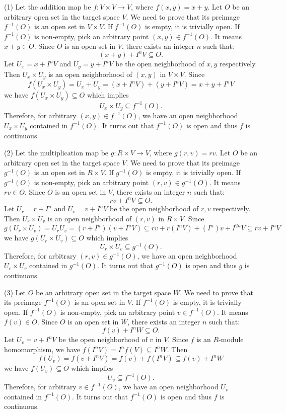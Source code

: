 \begin{solution}
    (1) Let the addition map be $f: V \times V \to V$, where $f(x, y) = x + y$.
    Let $O$ be an arbitrary open set in the target space $V$.
    We need to prove that its preimage $f^{-1}(O)$ is an open set in $V \times V$.
    If $f^{-1}(O)$ is empty, it is trivially open.
    If $f^{-1}(O)$ is non-empty, pick an arbitrary point $(x, y) \in f^{-1}(O)$.
    It means $x + y \in O$.
    Since $O$ is an open set in $V$, there exists an integer $n$ such that:$$(x + y) + I^n V \subseteq O.$$
    Let $U_x = x + I^n V$ and $U_y = y + I^n V$ be the open neighborhood of $x,y$ respectively. Then $U_x \times U_y$ is an open neighborhood of $(x, y)$ in $V \times V$.
    Since $$f(U_x \times U_y) = U_x + U_y = (x + I^n V) + (y + I^n V) = x + y + I^n V$$
    we have $f(U_x \times U_y) \subseteq O$ which implies $$U_x \times U_y \subseteq f^{-1}(O).$$
    Therefore, for arbitrary $(x,y)\in f^{-1}(O)$, we have an open neighborhood $U_x\times U_y$ contained in $f^{-1}(O)$. It turns out that $f^{-1}(O)$ is open and thus $f$ is continuous. 

    (2) Let the multiplication map be $g : R \times V \to V$, where $g(r,v) = rv$. Let $O$ be an arbitrary open set in the target space $V$. We need to prove that its preimage $g^{-1}(O)$ is an open set in $R \times V$. If $g^{-1}(O)$ is empty, it is trivially open. If $g^{-1}(O)$ is non-empty, pick an arbitrary point $(r,v) \in g^{-1}(O)$. It means $rv \in O$. Since $O$ is an open set in $V$, there exists an integer $n$ such that:$$rv + I^n V \subseteq O.$$Let $U_r = r + I^n$ and $U_v = v + I^n V$ be the open neighborhood of $r, v$ respectively. Then $U_r \times U_v$ is an open neighborhood of $(r,v)$ in $R \times V$. Since$$g(U_r \times U_v) = U_r U_v = (r + I^n)(v + I^n V) \subseteq rv + r(I^n V) + (I^n)v + I^{2n}V \subseteq rv + I^n V$$we have $g(U_r \times U_v) \subseteq O$ which implies$$U_r \times U_v \subseteq g^{-1}(O).$$Therefore, for arbitrary $(r,v) \in g^{-1}(O)$, we have an open neighborhood $U_r \times U_v$ contained in $g^{-1}(O)$. It turns out that $g^{-1}(O)$ is open and thus $g$ is continuous.

    (3) Let $O$ be an arbitrary open set in the target space $W$. We need to prove that its preimage $f^{-1}(O)$ is an open set in $V$. If $f^{-1}(O)$ is empty, it is trivially open. If $f^{-1}(O)$ is non-empty, pick an arbitrary point $v \in f^{-1}(O)$. It means $f(v) \in O$. Since $O$ is an open set in $W$, there exists an integer $n$ such that:$$f(v) + I^n W \subseteq O.$$Let $U_v = v + I^n V$ be the open neighborhood of $v$ in $V$. Since $f$ is an $R$-module homomorphism, we have $f(I^n V) = I^n f(V) \subseteq I^n W$. Then$$f(U_v) = f(v + I^n V) = f(v) + f(I^n V) \subseteq f(v) + I^n W$$we have $f(U_v) \subseteq O$ which implies$$U_v \subseteq f^{-1}(O).$$Therefore, for arbitrary $v \in f^{-1}(O)$, we have an open neighborhood $U_v$ contained in $f^{-1}(O)$. It turns out that $f^{-1}(O)$ is open and thus $f$ is continuous.
\end{solution}


